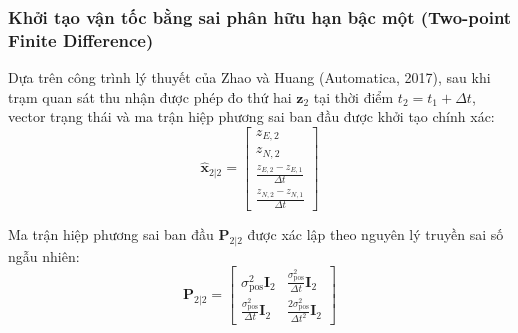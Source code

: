 \subsubsection{Khởi tạo vận tốc bằng sai phân hữu hạn bậc một (Two-point Finite Difference)}

\hspace{0.5cm} Dựa trên công trình lý thuyết của Zhao và Huang (Automatica, 2017), sau khi trạm quan sát thu nhận được phép đo thứ hai $\mathbf{z}_2$ tại thời điểm $t_2 = t_1 + \Delta t$, vector trạng thái và ma trận hiệp phương sai ban đầu được khởi tạo chính xác:
\begin{equation}
\hat{\mathbf{x}}_{2|2} = \begin{bmatrix}
z_{E, 2} \\
z_{N, 2} \\
\frac{z_{E, 2} - z_{E, 1}}{\Delta t} \\
\frac{z_{N, 2} - z_{N, 1}}{\Delta t}
\end{bmatrix}
\label{eq:two-point-state-initialization}
\end{equation}

Ma trận hiệp phương sai ban đầu $\mathbf{P}_{2|2}$ được xác lập theo nguyên lý truyền sai số ngẫu nhiên:
\begin{equation}
\mathbf{P}_{2|2} = \begin{bmatrix}
\sigma_{\text{pos}}^2 \mathbf{I}_2 & \frac{\sigma_{\text{pos}}^2}{\Delta t} \mathbf{I}_2 \\
\frac{\sigma_{\text{pos}}^2}{\Delta t} \mathbf{I}_2 & \frac{2\sigma_{\text{pos}}^2}{\Delta t^2} \mathbf{I}_2
\end{bmatrix}
\label{eq:two-point-covariance-initialization}
\end{equation}


